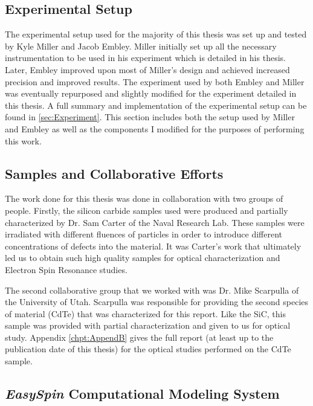\documentclass[oneside, astronomy, noacknowlegments]{BYUPhys}
\begin{document}
\subsection{Experimental Setup}

The experimental setup used for the majority of this thesis was set up and tested by Kyle Miller and Jacob Embley. Miller initially set up all the necessary instrumentation to be used in his experiment which is detailed in his thesis. Later, Embley improved upon most of Miller's design and achieved increased precision and improved results. The experiment used by both Embley and Miller was eventually repurposed and slightly modified for the experiment detailed in this thesis. A full summary and implementation of the experimental setup can be found in \ref{sec:Experiment}. This section includes both the setup used by Miller and Embley as well as the components I modified for the purposes of performing this work.

\subsection{Samples and Collaborative Efforts}

The work done for this thesis was done in collaboration with two groups of people. Firstly, the silicon carbide samples used were produced and partially characterized by Dr. Sam Carter of the Naval Research Lab. These samples were irradiated with different fluences of particles in order to introduce different concentrations of defects into the material. It was Carter's work that ultimately led us to obtain such high quality samples for optical characterization and Electron Spin Resonance studies.

The second collaborative group that we worked with was Dr. Mike Scarpulla of the University of Utah. Scarpulla was responsible for providing the second species of material (CdTe) that was characterized for this report. Like the SiC, this sample was provided with partial characterization and given to us for optical study. Appendix \ref{chpt:AppendB} gives the full report (at least up to the publication date of this thesis) for the optical studies performed on the CdTe sample.

\subsection{\textit{EasySpin} Computational Modeling System}
\end{document}
